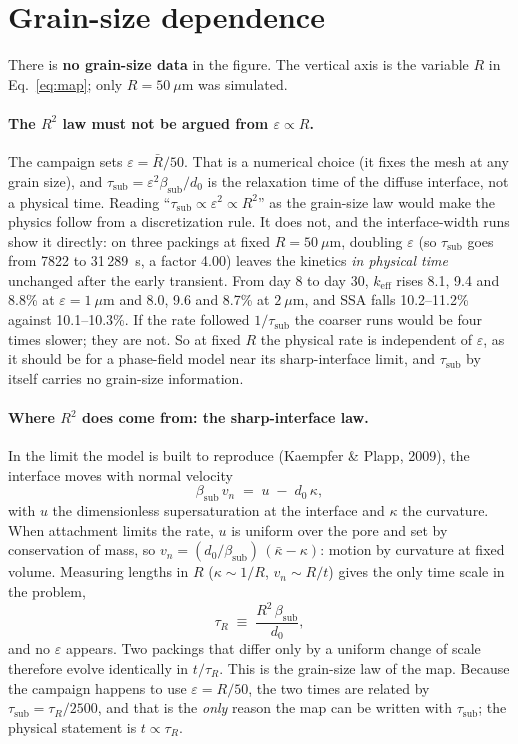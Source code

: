 \documentclass[11pt]{article}
\newcommand{\taus}{\tau_{\mathrm{sub}}}
\begin{document}
\section{Grain-size dependence}

There is \textbf{no grain-size data} in the figure. The vertical axis is the
variable $R$ in Eq.~\eqref{eq:map}; only $R = 50~\mu$m was simulated.

\paragraph{The $R^{2}$ law must not be argued from $\varepsilon \propto R$.}
The campaign sets $\varepsilon = \bar R/50$. That is a numerical choice (it
fixes the mesh at any grain size), and $\taus = \varepsilon^{2}\beta_{\mathrm{sub}}/d_0$
is the relaxation time of the diffuse interface, not a physical time. Reading
``$\taus \propto \varepsilon^{2} \propto R^{2}$'' as the grain-size law would
make the physics follow from a discretization rule. It does not, and the
interface-width runs show it directly: on three packings at fixed
$R = 50~\mu$m, doubling $\varepsilon$ (so $\taus$ goes from 7822 to
31\,289~s, a factor 4.00) leaves the kinetics \emph{in physical time}
unchanged after the early transient. From day 8 to day 30, $k_{\mathrm{eff}}$
rises 8.1, 9.4 and 8.8\% at $\varepsilon = 1~\mu$m and 8.0, 9.6 and 8.7\% at
$2~\mu$m, and SSA falls 10.2--11.2\% against 10.1--10.3\%. If the rate
followed $1/\taus$ the coarser runs would be four times slower; they are not.
So at fixed $R$ the physical rate is independent of $\varepsilon$, as it
should be for a phase-field model near its sharp-interface limit, and $\taus$
by itself carries no grain-size information.

\paragraph{Where $R^{2}$ does come from: the sharp-interface law.} In the
limit the model is built to reproduce (Kaempfer \& Plapp, 2009), the interface
moves with normal velocity
\begin{equation}
  \beta_{\mathrm{sub}}\,v_n \;=\; u \;-\; d_0\,\kappa ,
  \label{eq:sharp}
\end{equation}
with $u$ the dimensionless supersaturation at the interface and $\kappa$ the
curvature. When attachment limits the rate, $u$ is uniform over the pore and
set by conservation of mass, so $v_n = (d_0/\beta_{\mathrm{sub}})\,(\bar\kappa
- \kappa)$: motion by curvature at fixed volume. Measuring lengths in $R$
($\kappa \sim 1/R$, $v_n \sim R/t$) gives the only time scale in the problem,
\begin{equation}
  \tau_R \;\equiv\; \frac{R^{2}\,\beta_{\mathrm{sub}}}{d_0} ,
\end{equation}
and no $\varepsilon$ appears. Two packings that differ only by a uniform
change of scale therefore evolve identically in $t/\tau_R$. This is the
grain-size law of the map. Because the campaign happens to use
$\varepsilon = R/50$, the two times are related by
$\taus = \tau_R/2500$, and that is the \emph{only} reason the map can be
written with $\taus$; the physical statement is $t \propto \tau_R$.
\end{document}
